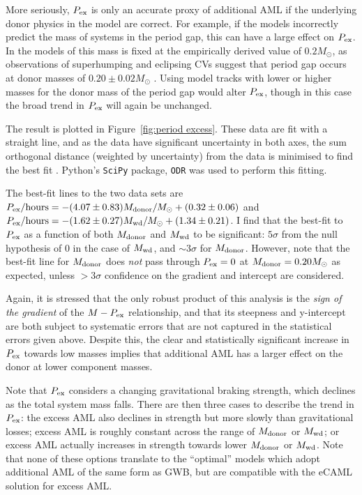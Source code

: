More seriously, $P_{\rm ex}$ is only an accurate proxy of additional AML if the underlying donor physics in the model are correct. For example, if the models incorrectly predict the mass of systems in the period gap, this can have a large effect on $P_{\rm ex}$. In the models of \citet{knigge11} this mass is fixed at the empirically derived value of $0.2 M_\odot$, as observations of superhumping and eclipsing CVs suggest that period gap occurs at donor masses of $0.20 \pm 0.02 M_\odot$ \citep{knigge2006}. Using model tracks with lower or higher masses for the donor mass of the period gap would alter $P_{\rm ex}$, though in this case the broad trend in $P_{\rm ex}$ will again be unchanged.

The result is plotted in Figure~\ref{fig:period excess}. These data are fit with a straight line, and as the data have significant uncertainty in both axes, the sum orthogonal distance (weighted by uncertainty) from the data is minimised to find the best fit \citep{hogg2010}. Python's \lstinline{SciPy} package, \lstinline{ODR} was used to perform this fitting.

 The best-fit lines to the two data sets are $P_{\rm ex} / \mathrm{hours} = -(4.07\pm0.83) M_{\rm donor}/M_\odot + (0.32\pm0.06)$ and $P_{\rm ex} / \mathrm{hours} = -(1.62\pm0.27) M_{\rm wd}/M_\odot + (1.34\pm0.21)$.
I find that the best-fit to $P_{\rm ex}$ as a function of both $M_{\rm donor}$ and $M_{\rm wd}$ to be significant: $5\sigma$ from the null hypothesis of 0 in the case of $M_{\rm wd}$, and $\sim 3\sigma$ for $M_{\rm donor}$.
 However, note that the best-fit line for $M_{\rm donor}$ does \textit{not} pass through $P_{\rm ex} = 0$ at $M_{\rm donor} = 0.20 M_\odot$ as expected, unless $>3\sigma$ confidence on the gradient and intercept are considered.

Again, it is stressed that the only robust product of this analysis is the \textit{sign of the gradient} of the $M - P_{\rm ex}$ relationship, and that its steepness and y-intercept are both subject to systematic errors that are not captured in the statistical errors given above. Despite this, the clear and statistically significant increase in $P_{\rm ex}$ towards low masses implies that additional AML has a larger effect on the donor at lower component masses.

Note that $P_{\rm ex}$ considers a changing gravitational braking strength, which declines as the total system mass falls.
There are then three cases to describe the trend in $P_{\rm ex}$: the excess AML also declines in strength but more slowly than gravitational losses; excess AML is roughly constant across the range of $M_{\rm donor}$ or $M_{\rm wd}$; or excess AML actually increases in strength towards lower $M_{\rm donor}$ or $M_{\rm wd}$. Note that none of these options translate to the ``optimal'' \citet{knigge11} models which adopt additional AML of the same form as GWB, but are compatible with the eCAML solution for excess AML.


